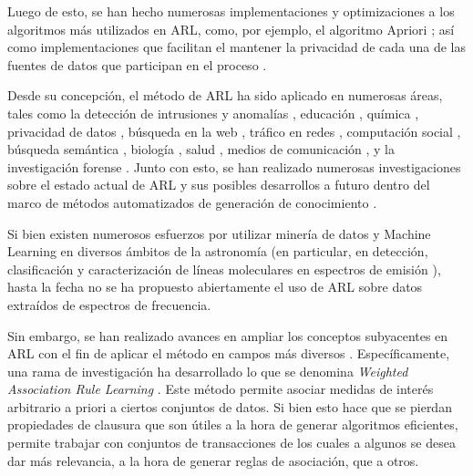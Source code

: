 Luego de esto, se han hecho numerosas implementaciones y optimizaciones a los algoritmos más utilizados en ARL, como, por ejemplo, el algoritmo Apriori \cite{bodon2010fast}; así como implementaciones que facilitan el mantener la privacidad de cada una de las fuentes de datos que participan en el proceso \cite{evfimievski2004privacy}.

Desde su concepción, el método de ARL ha sido aplicado en numerosas áreas, tales como la detección de intrusiones \cite{lee2000framework} y anomalías \cite{patcha2007overview} \cite{chandola2009anomaly}, educación \cite{romero2007educational} \cite{romero2008data}, química \cite{dehaspe1998finding}, privacidad de datos \cite{ghinita2008private}, búsqueda en la web \cite{ferragina2008personalized}, tráfico en redes \cite{estan2003automatically}, computación social \cite{li2008tag}, búsqueda semántica \cite{cohen2007associative}, biología \cite{kramer2001molecular} \cite{carmona2007genecodis}, salud \cite{karabatak2009expert} \cite{chaves2011efficient}, medios de comunicación \cite{davidson2010youtube} \cite{kobilarov2009media}, y la investigación forense \cite{iqbal2013unified}. Junto con esto, se han realizado numerosas investigaciones sobre el estado actual de ARL y sus posibles desarrollos a futuro dentro del marco de métodos automatizados de generación de conocimiento \cite{han2007frequent}.

Si bien existen numerosos esfuerzos por utilizar minería de datos y Machine Learning en diversos ámbitos de la astronomía (en particular, en detección, clasificación y caracterización de líneas moleculares en espectros de emisión \cite{vskoda2011searching}), hasta la fecha no se ha propuesto abiertamente el uso de ARL sobre datos extraídos de espectros de frecuencia.

Sin embargo, se han realizado avances en ampliar los conceptos subyacentes en ARL con el fin de aplicar el método en campos más diversos \cite{brin1997beyond}. Específicamente, una rama de investigación ha desarrollado lo que se denomina \textit{Weighted Association Rule Learning} \cite{wang2000efficient} \cite{cai1998mining}. Este método permite asociar medidas de interés arbitrario a priori a ciertos conjuntos de datos. Si bien esto hace que se pierdan propiedades de clausura que son útiles a la hora de generar algoritmos eficientes, permite trabajar con conjuntos de transacciones de los cuales a algunos se desea dar más relevancia, a la hora de generar reglas de asociación, que a otros.

